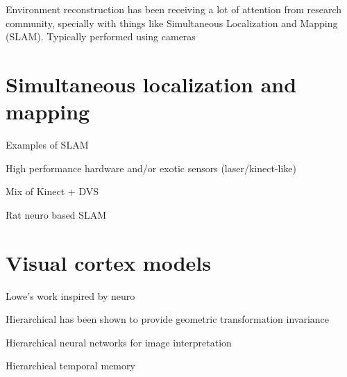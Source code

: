 Environment reconstruction has been receiving a lot of attention from research  community, specially with things like Simultaneous Localization and Mapping (SLAM). Typically performed using cameras


\section{Simultaneous localization and mapping}

Examples of SLAM

High performance hardware and/or exotic sensors (laser/kinect-like)

Mix of Kinect + DVS

Rat neuro based SLAM


\section{Visual cortex models}

Lowe's work inspired by neuro

Hierarchical has been shown to provide geometric transformation invariance

Hierarchical neural networks for image interpretation

Hierarchical temporal memory 

